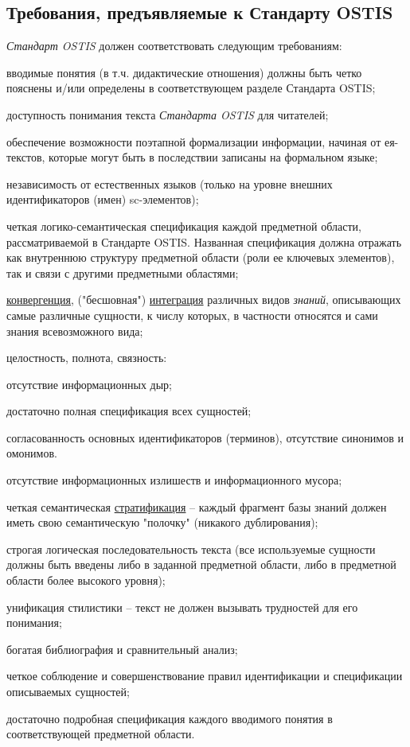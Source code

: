 \subsection{Требования, предъявляемые к Стандарту OSTIS}
\label{standard_requirements}

\textit{Стандарт OSTIS} должен соответствовать следующим требованиям:
\begin{textitemize}
	\item вводимые понятия (в т.ч. дидактические отношения) должны быть четко пояснены и/или определены в соответствующем разделе Стандарта OSTIS;
	\item доступность понимания текста \textit{Стандарта OSTIS} для читателей;
	\item обеспечение возможности поэтапной формализации информации, начиная от ея-текстов, которые могут быть в последствии записаны на формальном языке;
	\item независимость от естественных языков (только на уровне внешних идентификаторов (имен) sc-элементов);
	\item четкая логико-семантическая спецификация каждой предметной области, рассматриваемой в Стандарте OSTIS. Названная спецификация должна отражать как внутреннюю структуру предметной области (роли ее ключевых элементов), так и связи с другими предметными областями;
	\item \uline{конвергенция}, ("бесшовная"{}) \uline{интеграция} различных видов \textit{знаний}, описывающих самые различные сущности, к числу которых, в частности относятся и сами знания всевозможного вида;
	\item целостность, полнота, связность:
	\begin{textitemize}
		\item отсутствие информационных дыр;
		\item достаточно полная спецификация всех сущностей;
		\item согласованность основных идентификаторов (терминов), отсутствие синонимов и омонимов.
	\end{textitemize}
	\item отсутствие информационных излишеств и информационного мусора;
	\item четкая семантическая \uline{стратификация} -- каждый фрагмент базы знаний должен иметь свою семантическую "полочку"{} (никакого дублирования);
	\item строгая логическая последовательность текста (все используемые сущности должны быть введены либо в заданной предметной области, либо в предметной области более высокого уровня);
	\item унификация стилистики -- текст не должен вызывать трудностей для его понимания;
	\item богатая библиография и сравнительный анализ;
	\item четкое соблюдение и совершенствование правил идентификации и спецификации описываемых сущностей;
	\item достаточно подробная спецификация каждого вводимого понятия в соответствующей предметной области.
\end{textitemize}


